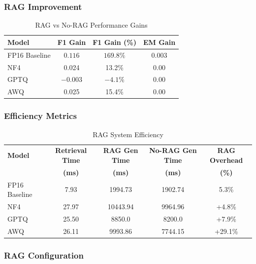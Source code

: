\newpage
\subsubsection{RAG Improvement}

\begin{table}[h]
\centering
\caption{RAG vs No-RAG Performance Gains}
\label{tab:rag_improvement}
\begin{tabular}{@{}lccc@{}}
\toprule
\textbf{Model} & \textbf{F1 Gain} & \textbf{F1 Gain (\%)} & \textbf{EM Gain} \\
\midrule
FP16 Baseline & $0.116$ & $169.8\%$ & 0.003 \\
NF4 & 0.024 & 13.2\% & 0.00 \\
GPTQ & $-0.003$ & $-4.1\%$ & 0.00 \\
AWQ & 0.025 & 15.4\% & 0.00 \\
\bottomrule
\end{tabular}
\end{table}

\subsubsection{Efficiency Metrics}

\begin{table}[h]
\centering
\caption{RAG System Efficiency}
\label{tab:rag_efficiency}
\begin{tabular}{@{}lcccc@{}}
\toprule
\textbf{Model} & \textbf{Retrieval Time} & \textbf{RAG Gen Time} & \textbf{No-RAG Gen Time} & \textbf{RAG Overhead} \\
 & \textbf{(ms)} & \textbf{(ms)} & \textbf{(ms)} & \textbf{(\%)} \\
\midrule
FP16 Baseline & 7.93 & 1994.73 & 1902.74 & 5.3\% \\
NF4 & 27.97 & 10443.94 & 9964.96 & +4.8\% \\
GPTQ & 25.50 & 8850.0 & 8200.0 & +7.9\% \\
AWQ & 26.11 & 9993.86 & 7744.15 & +29.1\% \\
\bottomrule
\end{tabular}
\end{table}

\subsubsection{RAG Configuration}

